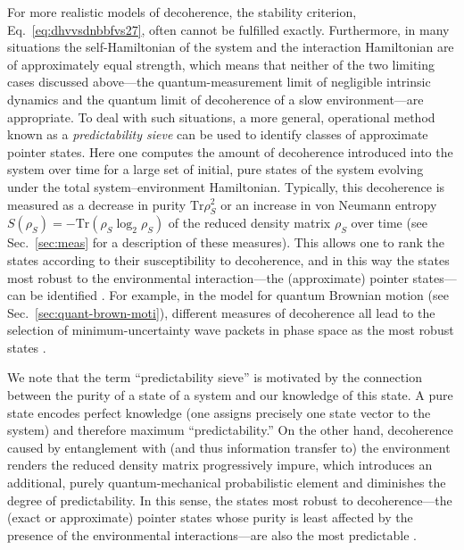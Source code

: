 \documentclass[3p,sort&compress]{elsarticle}
\newcommand{\op}[1]{#1}
\begin{document}
For more realistic models of decoherence, the stability criterion, Eq.~\eqref{eq:dhvvsdnbbfvs27}, often cannot be fulfilled exactly. Furthermore, in many situations the self-Hamiltonian of the system and the interaction Hamiltonian are of approximately equal strength, which means that neither of the two limiting cases discussed above---the quantum-measurement limit of negligible intrinsic dynamics and the quantum limit of decoherence of a slow environment---are appropriate. To deal with such situations, a more general, operational method known as a \emph{predictability sieve} \cite{Zurek:1993:pu,Zurek:1993:qq,Zurek:1998:re} can be used to identify classes of approximate pointer states. Here one computes the amount of decoherence introduced into the system over time for a large set of initial, pure states of the system evolving under the total system--environment Hamiltonian. Typically, this decoherence is measured as a decrease in purity $\text{Tr} \op{\rho}_S^2$ or an increase in  von Neumann entropy $S(\op{\rho}_S) = - \text{Tr}\left( \op{\rho}_S \log_2 \op{\rho}_S \right)$ of the reduced density matrix $\op{\rho}_S$ over time (see Sec.~\ref{sec:meas} for a description of these measures). This allows one to rank the states according to their susceptibility to decoherence, and in this way the states most robust to the environmental interaction---the (approximate) pointer states---can be identified \cite{Zurek:1993:pu,Zurek:1993:qq,Zurek:1998:re,Zurek:2002:ii}. For example, in the model for quantum Brownian motion (see Sec.~\ref{sec:quant-brown-moti}), different measures of decoherence all lead to the selection of minimum-uncertainty wave packets in phase space as the most robust states \cite{Kubler:1973:ux,Zurek:1993:pu,Zurek:2002:ii,Diosi:2000:yn,Joos:2003:jh,Eisert:2003:ib}.

We note that the term ``predictability sieve'' is motivated by the connection between the purity of a state of a system and our knowledge of this state. A pure state encodes perfect knowledge (one assigns precisely one state vector to the system) and therefore maximum ``predictability.''  On the other hand, decoherence caused by entanglement with (and thus information transfer to) the environment renders the reduced density matrix progressively impure, which introduces an additional, purely quantum-mechanical probabilistic element and diminishes the degree of predictability.  In this sense, the states most robust to decoherence---the (exact or approximate) pointer states  whose purity is least affected by the presence of the environmental interactions---are also the most predictable \cite{Zurek:1993:pu,Zurek:1993:qq,Zurek:1998:re}.
\end{document}
